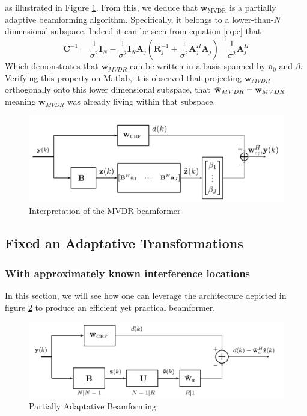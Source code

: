 \documentclass[12pt]{article}
\begin{document}
as illustrated in Figure \ref{fig:mvdr_interp}. From this, we deduce that \( \mathbf{w}_{\text{MVDR}} \) is a partially adaptive beamforming algorithm. Specifically, it belongs to a lower-than-\( N \) dimensional subspace. Indeed it can be seen from equation \ref{eq:c} that
\begin{equation}
\mathbf{C}^{-1} = \frac{1}{\sigma^2}\mathbf{I}_N-\frac{1}{\sigma^2}\mathbf{I}_N\mathbf{A}_j\left(\mathbf{R}_j^{-1}+\frac{1}{\sigma^2}\mathbf{A}_j^H\mathbf{A}_j\right)^{-1}\frac{1}{\sigma^2}\mathbf{A}_j^H
\end{equation}
Which demonstrates that $\mathbf{w}_{MVDR}$ can be written in a basis spanned by $\mathbf{a}_0$ and $\beta$. Verifying this property on Matlab, it is observed that projecting $\mathbf{w}_{MVDR}$ orthogonally onto this lower dimensional subspace, that $\Bar{\mathbf{w}}_{MVDR} = \mathbf{w}_{MVDR}$ meaning $\mathbf{w}_{MVDR}$ was already living within that subspace.

\begin{figure}[H]
    \centering
    \includegraphics[width=.8\linewidth]{paper/figures/mvdr_interp.png}
    \caption{Interpretation of the MVDR beamformer}
    \label{fig:mvdr_interp}
\end{figure}
\subsection{Fixed an Adaptative Transformations}
\subsubsection{With approximately known interference locations}
In this section, we will see how one can leverage the architecture depicted in figure \ref{fig:partially_adaptative} to produce an efficient yet practical beamformer.

\begin{figure}[H]
    \centering
    \includegraphics[width=.8\linewidth]{paper/figures/partially_adaptative.png}
    \caption{Partially Adaptative Beamforming}
    \label{fig:partially_adaptative}
\end{figure}
\end{document}

